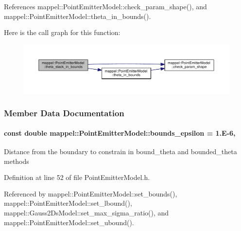 References mappel\+::\+Point\+Emitter\+Model\+::check\+\_\+param\+\_\+shape(), and mappel\+::\+Point\+Emitter\+Model\+::theta\+\_\+in\+\_\+bounds().



Here is the call graph for this function\+:\nopagebreak
\begin{figure}[H]
\begin{center}
\leavevmode
\includegraphics[width=350pt]{classmappel_1_1PointEmitterModel_a7b6a59b4bc796b440025cffb7a6159f8_cgraph}
\end{center}
\end{figure}




\subsubsection{Member Data Documentation}
\paragraph[{\texorpdfstring{bounds\+\_\+epsilon}{bounds_epsilon}}]{\setlength{\rightskip}{0pt plus 5cm}const double mappel\+::\+Point\+Emitter\+Model\+::bounds\+\_\+epsilon = 1.\+E-\/6\hspace{0.3cm}{\ttfamily [static]}, {\ttfamily [inherited]}}\hypertarget{classmappel_1_1PointEmitterModel_ac987a119137b85a27704b1c40e3fab8c}{}\label{classmappel_1_1PointEmitterModel_ac987a119137b85a27704b1c40e3fab8c}
Distance from the boundary to constrain in bound\+\_\+theta and bounded\+\_\+theta methods 

Definition at line 52 of file Point\+Emitter\+Model.\+h.



Referenced by mappel\+::\+Point\+Emitter\+Model\+::set\+\_\+bounds(), mappel\+::\+Point\+Emitter\+Model\+::set\+\_\+lbound(), mappel\+::\+Gauss2\+Ds\+Model\+::set\+\_\+max\+\_\+sigma\+\_\+ratio(), and mappel\+::\+Point\+Emitter\+Model\+::set\+\_\+ubound().

